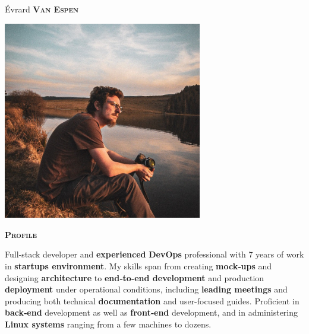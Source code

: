 \documentclass[10pt, a4paper]{article}
\newcommand{\headleft}[1]{\vspace*{3ex}\textsc{\textbf{#1}}\par%
    \vspace*{-1.5ex}\hrulefill\par\vspace*{0.7ex}}
\begin{document}
\setlength{\topskip}{0pt}
\setlength{\parindent}{0pt}
\setlength{\parskip}{0pt}
\setlength{\fboxsep}{0pt}
\pagestyle{empty}
\raggedbottom

\begin{minipage}[t]{0.33\textwidth} %

\vspace{-.2ex} %
\colorbox{accent!90}{\color{white}  %
\textwidth\relax%
\begin{minipage}[t][298mm][t]{0.88\textwidth}
\raggedright
\vspace*{2.5ex}

\Large Évrard \textbf{\textsc{Van Espen}} \normalsize 

\null\hfill\includegraphics[width=0.65\textwidth]{me.jpeg}\hfill\null

{\small\headleft{Profile}}
{\small
Full‑stack developer and \textbf{experienced} \textbf{DevOps} professional with 7 years of work in \textbf{startups environment}. My skills span from creating \textbf{mock‑ups} and designing \textbf{architecture} to \textbf{end‑to‑end development} and production \textbf{deployment} under operational conditions, including \textbf{leading meetings} and producing both technical \textbf{documentation} and user-focused guides. Proficient in \textbf{back‑end} development as well as \textbf{front‑end} development, and in administering \textbf{Linux systems} ranging from a few machines to dozens.
}


\end{minipage}}
\end{minipage}
\end{document}
